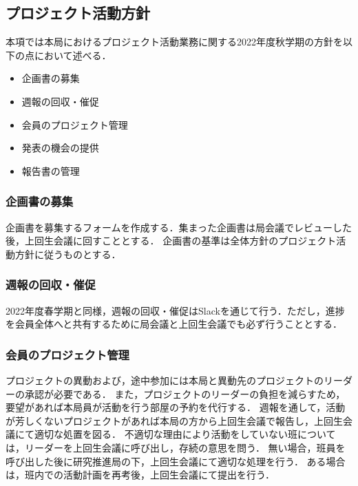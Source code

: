 \subsection*{プロジェクト活動方針}

本項では本局におけるプロジェクト活動業務に関する2022年度秋学期の方針を以下の点において述べる．

\begin{itemize}
  \item 企画書の募集
  \item 週報の回収・催促
  \item 会員のプロジェクト管理
  \item 発表の機会の提供
  \item 報告書の管理
\end{itemize}

\subsubsection*{企画書の募集}

企画書を募集するフォームを作成する．集まった企画書は局会議でレビューした後，上回生会議に回すこととする．
企画書の基準は全体方針のプロジェクト活動方針に従うものとする．

\subsubsection*{週報の回収・催促}

2022年度春学期と同様，週報の回収・催促はSlackを通じて行う．ただし，進捗を会員全体へと共有するために局会議と上回生会議でも必ず行うこととする．

\subsubsection*{会員のプロジェクト管理}

プロジェクトの異動および，途中参加には本局と異動先のプロジェクトのリーダーの承認が必要である．
また，プロジェクトのリーダーの負担を減らすため，要望があれば本局員が活動を行う部屋の予約を代行する．
週報を通して，活動が芳しくないプロジェクトがあれば本局の方から上回生会議で報告し，上回生会議にて適切な処置を図る．
不適切な理由により活動をしていない班については，リーダーを上回生会議に呼び出し，存続の意思を問う．
無い場合，班員を呼び出した後に研究推進局の下，上回生会議にて適切な処理を行う．
ある場合は，班内での活動計画を再考後，上回生会議にて提出を行う．


